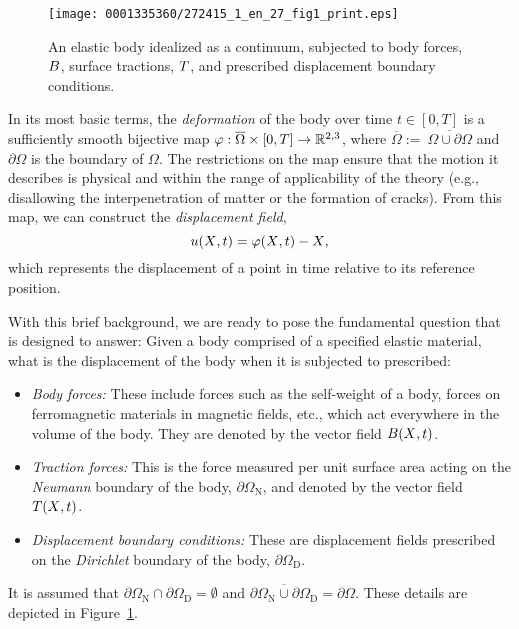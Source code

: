 \begin{figure}[!b]
\centering
\texttt{[image: 0001335360/272415\_1\_en\_27\_fig1\_print.eps]}
\caption{An elastic body idealized as a continuum, subjected to body
forces, $\mbox{$ B$}$, surface tractions, $\mbox{$ T$}$, and prescribed
displacement boundary conditions.}\label{fig:narayanan:continuumpotato}
\end{figure}

In its most basic terms, the {\em deformation} of the body over time
$t \in [0, T]$ is a sufficiently smooth bijective map $\mbox{$\varphi$}:
\overline{\Omega} \times [0,T] \rightarrow \mathbb{R}^{2, 3}$, where
$\overline{\Omega} :=\ \overline{\Omega\cup\partial\Omega}$ and
$\partial\Omega$ is the boundary of $\Omega$. The restrictions on the
map ensure that the motion it describes is physical and within the
range of applicability of the theory (e.g., disallowing the
interpenetration of matter or the formation of cracks). From this map,
we can construct the {\em displacement field},
\begin{equation}
  \mbox{$ u$}(\mbox{$ X$}, t) = \mbox{$\varphi$}(\mbox{$ X$}, t) - \mbox{$ X$},
\end{equation}
which represents the displacement of a point in time
relative to its reference position.

With this brief background, we are ready to pose the fundamental
question that \twist{} is designed to answer: Given a body comprised
of a specified elastic material, what is the displacement of the body
when it is subjected to prescribed:
\begin{itemize}
\item {\em Body forces:} These include forces such as the self-weight
  of a body, forces on ferromagnetic materials in magnetic fields,
  etc., which act everywhere in the volume of the body. They are
  denoted by the vector field $\mbox{$ B$}(\mbox{$ X$}, t)$.
\item {\em Traction forces:} This is the force measured per unit
  surface area acting on the {\em Neumann} boundary of the body,
  $\partial\Omega_{\mathrm{N}}$, and denoted by the vector field
  $\mbox{$ T$}(\mbox{$ X$}, t)$.
\item {\em Displacement boundary conditions:} These are displacement
  fields prescribed on the {\em Dirichlet} boundary of the body,
  $\partial\Omega_{\mathrm{D}}$.
\end{itemize}
It is assumed that $\partial\Omega_{\mathrm{N}}
\cap \partial\Omega_{\mathrm{D}} = \emptyset$ and
$\overline{\partial\Omega_{\mathrm{N}} \cup \partial\Omega_{\mathrm{D}}}
= \partial\Omega$. These details are depicted in
Figure~\ref{fig:narayanan:continuumpotato}.


